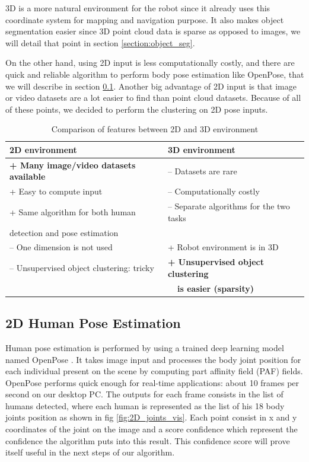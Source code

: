 3D is a more natural environment for the robot since it already uses this coordinate system for mapping and navigation purpose. It also makes object segmentation easier since 3D point cloud data is sparse as opposed to images, we will detail that point in section \ref{section:object_seg}.

On the other hand, using 2D input is less computationally costly, and there are quick and reliable algorithm to perform body pose estimation like OpenPose, that we will describe in section \ref{section:openpose}. Another big advantage of 2D input is that image or video datasets are a lot easier to find than point cloud datasets. Because of all of these points, we decided to perform the clustering on 2D pose inputs.

\begin{table}[h]
    \centering
    \caption{Comparison of features between 2D and 3D environment}
    \label{tab:dimension_comparison}
    \begin{tabular}{|l|l|}
        \hline
        2D environment & 3D environment \\ \hline
        \textbf{+ Many image/video datasets available} & -- Datasets are rare \\
        + Easy to compute input & -- Computationally costly \\
        + Same algorithm for both human & -- Separate algorithms for the two tasks \\ detection and pose estimation & \\
        -- One dimension is not used & + Robot environment is in 3D \\
        -- Unsupervised object clustering: tricky & \textbf{+ Unsupervised object clustering} \\
        & \textbf{~~is easier (sparsity)}
        \\ \hline
    \end{tabular}
\end{table}

\subsection{2D Human Pose Estimation}
\label{section:openpose}
Human pose estimation is performed by using a trained deep learning model named OpenPose \cite{Openpose}. It takes image input and processes the body joint position for each individual present on the scene by computing part affinity field (PAF) fields. OpenPose performs quick enough for real-time applications: about 10 frames per second on our desktop PC. The outputs for each frame consists in the list of humans detected, where each human is represented as the list of his 18 body joints position as shown in fig \ref{fig:2D_joints_vis}. Each point consist in x and y coordinates of the joint on the image and a score confidence which represent the confidence the algorithm puts into this result. This confidence score will prove itself useful in the next steps of our algorithm.

